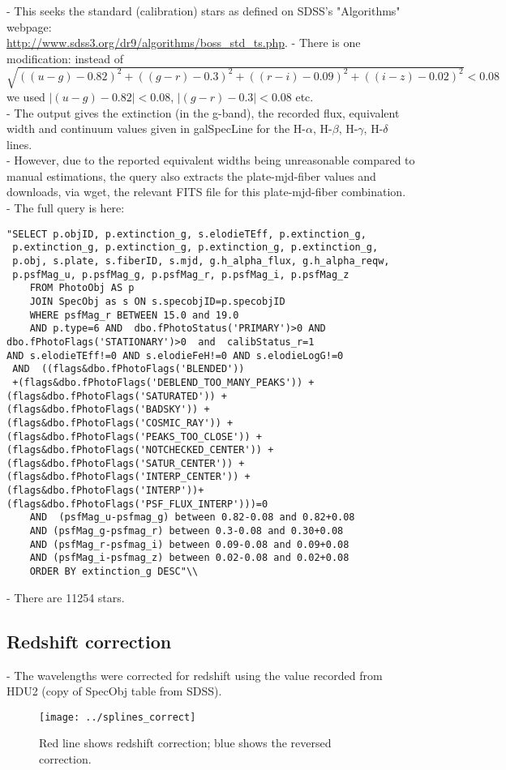 \documentclass[manuscript]{aastex}
\begin{document}
- This seeks the standard (calibration) stars as defined on SDSS's "Algorithms" webpage:\\  \url{http://www.sdss3.org/dr9/algorithms/boss\_std\_ts.php}. 
- There is one modification: instead of \\ $\sqrt{((u-g)-0.82)^2+((g-r)-0.3)^2+((r-i)-0.09)^2+((i-z)-0.02)^2}<0.08$ we used $|(u-g)-0.82|<0.08$, $|(g-r)-0.3|<0.08$ etc. \\
- The output gives the extinction (in the g-band), the recorded flux, equivalent width and continuum values given in galSpecLine for the H-$\alpha$, H-$\beta$, H-$\gamma$, H-$\delta$ lines. \\
- However, due to the reported equivalent widths being unreasonable compared to manual estimations, the query also extracts the plate-mjd-fiber values and downloads, via wget, the relevant FITS file for this plate-mjd-fiber combination. \\
- The full query is here: 
\begin{verbatim}"SELECT p.objID, p.extinction_g, s.elodieTEff, p.extinction_g,
 p.extinction_g, p.extinction_g, p.extinction_g, p.extinction_g,
 p.obj, s.plate, s.fiberID, s.mjd, g.h_alpha_flux, g.h_alpha_reqw, 
 p.psfMag_u, p.psfMag_g, p.psfMag_r, p.psfMag_i, p.psfMag_z 
    FROM PhotoObj AS p 
    JOIN SpecObj as s ON s.specobjID=p.specobjID 
    WHERE psfMag_r BETWEEN 15.0 and 19.0 
    AND p.type=6 AND  dbo.fPhotoStatus('PRIMARY')>0 AND 
dbo.fPhotoFlags('STATIONARY')>0  and  calibStatus_r=1 
AND s.elodieTEff!=0 AND s.elodieFeH!=0 AND s.elodieLogG!=0 
 AND  ((flags&dbo.fPhotoFlags('BLENDED')) 
 +(flags&dbo.fPhotoFlags('DEBLEND_TOO_MANY_PEAKS')) +   
(flags&dbo.fPhotoFlags('SATURATED')) +
(flags&dbo.fPhotoFlags('BADSKY')) + 
(flags&dbo.fPhotoFlags('COSMIC_RAY')) +
(flags&dbo.fPhotoFlags('PEAKS_TOO_CLOSE')) +   
(flags&dbo.fPhotoFlags('NOTCHECKED_CENTER')) +
(flags&dbo.fPhotoFlags('SATUR_CENTER')) +  
(flags&dbo.fPhotoFlags('INTERP_CENTER')) +
(flags&dbo.fPhotoFlags('INTERP'))+  
(flags&dbo.fPhotoFlags('PSF_FLUX_INTERP')))=0 
    AND  (psfMag_u-psfmag_g) between 0.82-0.08 and 0.82+0.08 
    AND (psfMag_g-psfmag_r) between 0.3-0.08 and 0.30+0.08 
    AND (psfMag_r-psfmag_i) between 0.09-0.08 and 0.09+0.08 
    AND (psfMag_i-psfmag_z) between 0.02-0.08 and 0.02+0.08 
    ORDER BY extinction_g DESC"\\
\end{verbatim}
- There are 11254 stars.
\subsection{Redshift correction}
- The wavelengths were corrected for redshift using the value recorded from HDU2 (copy of SpecObj table from SDSS).\\
\begin{figure}
\texttt{[image: ../splines\_correct]}\\
\caption{Red line shows redshift correction; blue shows the reversed correction.}
\end{figure}
\end{document}
